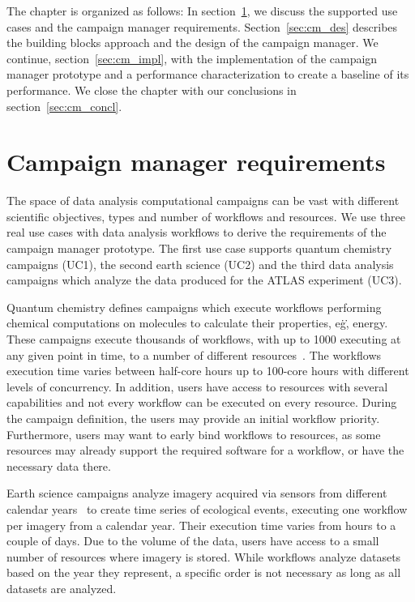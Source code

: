 The chapter is organized as follows:
In section~\ref{sec:cm_req}, we discuss the supported use cases and the campaign manager requirements.
Section~\ref{sec:cm_des} describes the building blocks approach and the design of the campaign manager.
We continue, section~\ref{sec:cm_impl}, with the implementation of the campaign manager prototype and a performance characterization to create a baseline of its performance.
We close the chapter with our conclusions in section~\ref{sec:cm_concl}.

\section{Campaign manager requirements}
\label{sec:cm_req}

The space of data analysis computational campaigns can be vast with different scientific objectives, types and number of workflows and resources.
We use three real use cases with data analysis workflows to derive the requirements of the campaign manager prototype.
The first use case supports quantum chemistry campaigns (UC1), the second earth science (UC2) and the third data analysis campaigns which analyze the data produced for the ATLAS experiment (UC3).

Quantum chemistry defines campaigns which execute workflows performing chemical computations on molecules to calculate their properties, e\.g\., energy.
These campaigns execute thousands of workflows, with up to 1000 executing at any given point in time, to a number of different resources~\cite{smith2020molssi}.
The workflows execution time varies between half-core hours up to 100-core hours with different levels of concurrency.
In addition, users have access to resources with several capabilities and not every workflow can be executed on every resource.
During the campaign definition, the users may provide an initial workflow priority.
Furthermore, users may want to early bind workflows to resources, as some resources may already support the required software for a workflow, or have the necessary data there.

Earth science campaigns analyze imagery acquired via sensors from different calendar years~\cite{paraskevakos2019workflow} to create time series of ecological events, executing one workflow per imagery from a calendar year.
Their execution time varies from hours to a couple of days.
Due to the volume of the data, users have access to a small number of resources where imagery is stored.
While workflows analyze datasets based on the year they represent, a specific order is not necessary as long as all datasets are analyzed.

